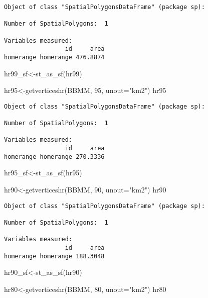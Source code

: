 \documentclass[
  letterpaper,
]{book}
\newenvironment{Shaded}{\begin{snugshade}}{\end{snugshade}}
\newcommand{\AttributeTok}[1]{\textcolor[rgb]{0.40,0.45,0.13}{#1}}
\newcommand{\DecValTok}[1]{\textcolor[rgb]{0.68,0.00,0.00}{#1}}
\newcommand{\FunctionTok}[1]{\textcolor[rgb]{0.28,0.35,0.67}{#1}}
\newcommand{\NormalTok}[1]{\textcolor[rgb]{0.00,0.23,0.31}{#1}}
\newcommand{\OtherTok}[1]{\textcolor[rgb]{0.00,0.23,0.31}{#1}}
\newcommand{\StringTok}[1]{\textcolor[rgb]{0.13,0.47,0.30}{#1}}
\begin{document}
\begin{verbatim}
Object of class "SpatialPolygonsDataFrame" (package sp):

Number of SpatialPolygons:  1

Variables measured:
                 id     area
homerange homerange 476.8874
\end{verbatim}

\begin{Shaded}
\begin{Highlighting}[]
\NormalTok{hr99\_sf}\OtherTok{\textless{}{-}}\FunctionTok{st\_as\_sf}\NormalTok{(hr99)}

\NormalTok{hr95}\OtherTok{\textless{}{-}}\FunctionTok{getverticeshr}\NormalTok{(BBMM, }\DecValTok{95}\NormalTok{, }\AttributeTok{unout=}\StringTok{"km2"}\NormalTok{)}
\NormalTok{hr95}
\end{Highlighting}
\end{Shaded}

\begin{verbatim}
Object of class "SpatialPolygonsDataFrame" (package sp):

Number of SpatialPolygons:  1

Variables measured:
                 id     area
homerange homerange 270.3336
\end{verbatim}

\begin{Shaded}
\begin{Highlighting}[]
\NormalTok{hr95\_sf}\OtherTok{\textless{}{-}}\FunctionTok{st\_as\_sf}\NormalTok{(hr95)}

\NormalTok{hr90}\OtherTok{\textless{}{-}}\FunctionTok{getverticeshr}\NormalTok{(BBMM, }\DecValTok{90}\NormalTok{, }\AttributeTok{unout=}\StringTok{"km2"}\NormalTok{)}
\NormalTok{hr90}
\end{Highlighting}
\end{Shaded}

\begin{verbatim}
Object of class "SpatialPolygonsDataFrame" (package sp):

Number of SpatialPolygons:  1

Variables measured:
                 id     area
homerange homerange 188.3048
\end{verbatim}

\begin{Shaded}
\begin{Highlighting}[]
\NormalTok{hr90\_sf}\OtherTok{\textless{}{-}}\FunctionTok{st\_as\_sf}\NormalTok{(hr90)}

\NormalTok{hr80}\OtherTok{\textless{}{-}}\FunctionTok{getverticeshr}\NormalTok{(BBMM, }\DecValTok{80}\NormalTok{, }\AttributeTok{unout=}\StringTok{"km2"}\NormalTok{)}
\NormalTok{hr80}
\end{Highlighting}
\end{Shaded}
\end{document}
